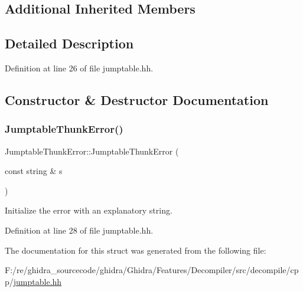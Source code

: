 \subsection*{Additional Inherited Members}


\subsection{Detailed Description}


Definition at line 26 of file jumptable.\+hh.



\subsection{Constructor \& Destructor Documentation}
\mbox{\label{struct_jumptable_thunk_error_a1044f6b610a293ea9c07dc4aa12313cf}} 
\subsubsection{\texorpdfstring{JumptableThunkError()}{JumptableThunkError()}}
{\footnotesize\ttfamily Jumptable\+Thunk\+Error\+::\+Jumptable\+Thunk\+Error (\begin{DoxyParamCaption}\item[{const string \&}]{s }\end{DoxyParamCaption})\hspace{0.3cm}{\ttfamily [inline]}}



Initialize the error with an explanatory string. 



Definition at line 28 of file jumptable.\+hh.



The documentation for this struct was generated from the following file\+:\begin{DoxyCompactItemize}
\item 
F\+:/re/ghidra\+\_\+sourcecode/ghidra/\+Ghidra/\+Features/\+Decompiler/src/decompile/cpp/\mbox{\hyperlink{jumptable_8hh}{jumptable.\+hh}}\end{DoxyCompactItemize}
